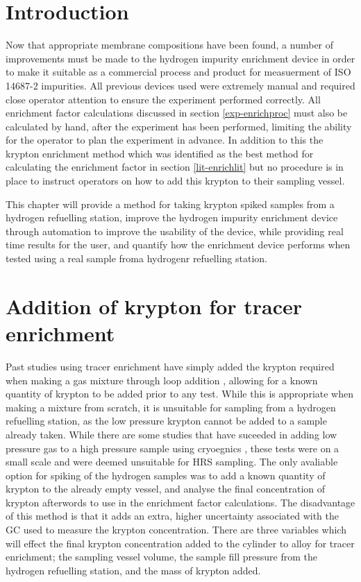 \section{Introduction}
Now that appropriate membrane compositions have been found, a number of improvements must be made to the hydrogen impurity enrichment device in order to make it suitable as a commercial process and product for measuerment of ISO 14687-2 impurities. All previous devices used were extremely manual and required close operator attention to ensure the experiment performed correctly. All enrichment factor calculations discussed in section \ref{exp-enrichproc} must also be calculated by hand, after the experiment has been performed, limiting the ability for the operator to plan the experiment in advance. In addition to this the krypton enrichment method which was identified as the best method for calculating the enrichment factor in section \ref{lit-enrichlit} but no procedure is in place to instruct operators on how to add this krypton to their sampling vessel. 

This chapter will provide a method for taking krypton spiked samples from a hydrogen refuelling station, improve the hydrogen impurity enrichment device through automation to improve the usability of the device, while providing real time results for the user, and quantify how the enrichment device performs when tested using a real sample froma  hydrogenr refuelling station. 

\section{Addition of krypton for tracer enrichment}\label{kryptonspike}
Past studies using tracer enrichment have simply added the krypton required when making a gas mixture through loop addition \cite{Murugan2014}, allowing for a known quantity of krypton to be added prior to any test. While this is appropriate when making a mixture from scratch, it is unsuitable for sampling from a hydrogen refuelling station, as the low pressure krypton cannot be added to a sample already taken. While there are some studies that have suceeded in adding low pressure gas to a high pressure sample using cryoegnics \cite{Podesta2017}, these tests were on a small scale and were deemed unsuitable for HRS sampling. The only avaliable option for spiking of the hydrogen samples was to add a known quantity of krypton to the already empty vessel, and analyse the final concentration of krypton afterwords to use in the enrichment factor calculations. The disadvantage of this method is that it adds an extra, higher uncertainty associated with the GC used to measure the krypton concentration. There are three variables which will effect the final krypton concentration added to the cylinder to alloy for tracer enrichment; the sampling vessel volume, the sample fill pressure from the hydrogen refuelling station, and the mass of krypton added.  

